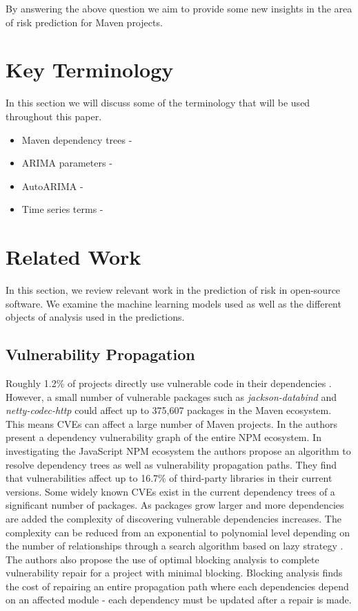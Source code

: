 \documentclass[conference]{IEEEtran}
\begin{document}
By answering the above question we aim to provide some new insights in the area of risk prediction for Maven projects. 

\section{Key Terminology}
In this section we will discuss some of the terminology that will be used throughout this paper. 

\begin{itemize}
    \item Maven dependency trees -  
    \item ARIMA parameters - 
    \item AutoARIMA - 
    \item Time series terms - 
\end{itemize}

\section{Related Work}
In this section, we review relevant work in the prediction of risk in open-source software. We examine the machine learning models used as well as the different objects of analysis used in the predictions.  

\subsection{Vulnerability Propagation}
Roughly 1.2\% of projects directly use vulnerable code in their dependencies \cite{a_m_mir_effect_2023}. However, a small number of vulnerable packages such as \textit{jackson-databind} and \textit{netty-codec-http} could affect up to 375,607 packages in the Maven ecosystem. This means CVEs can affect a large number of Maven projects. In \cite{c_liu_demystifying_2022} the authors present a dependency vulnerability graph of the entire NPM ecosystem. In investigating the JavaScript NPM ecosystem the authors propose an algorithm to resolve dependency trees as well as vulnerability propagation paths. They find that vulnerabilities affect up to 16.7\% of third-party libraries in their current versions. Some widely known CVEs exist in the current dependency trees of a significant number of packages. As packages grow larger and more dependencies are added the complexity of discovering vulnerable dependencies increases. The complexity can be reduced from an exponential to polynomial level depending on the number of relationships through a search algorithm based on lazy strategy \cite{w_hu_open_2019}. The authors also propose the use of optimal blocking analysis to complete vulnerability repair for a project with minimal blocking. Blocking analysis finds the cost of repairing an entire propagation path where each dependencies depend on an affected module - each dependency must be updated after a repair is made. 
\end{document}
